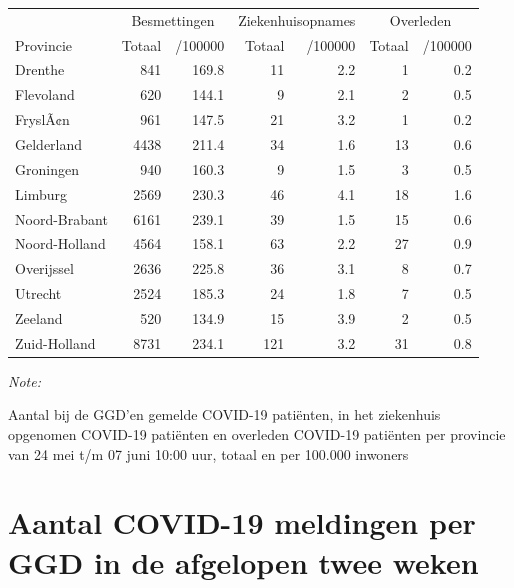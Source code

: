 \documentclass[
  english,
  man,floatsintext]{apa6}
\begin{document}
\begin{table}
\centering
\begin{threeparttable}
\begin{tabular}{lrrrrrr}
\toprule
\multicolumn{1}{c}{ } & \multicolumn{2}{c}{Besmettingen} & \multicolumn{2}{c}{Ziekenhuisopnames} & \multicolumn{2}{c}{Overleden} \\
\cmidrule(l{3pt}r{3pt}){2-3} \cmidrule(l{3pt}r{3pt}){4-5} \cmidrule(l{3pt}r{3pt}){6-7}
Provincie & Totaal & /100000 & Totaal & /100000 & Totaal & /100000\\
\midrule
Drenthe & 841 & 169.8 & 11 & 2.2 & 1 & 0.2\\
Flevoland & 620 & 144.1 & 9 & 2.1 & 2 & 0.5\\
FryslÃ¢n & 961 & 147.5 & 21 & 3.2 & 1 & 0.2\\
Gelderland & 4438 & 211.4 & 34 & 1.6 & 13 & 0.6\\
Groningen & 940 & 160.3 & 9 & 1.5 & 3 & 0.5\\
Limburg & 2569 & 230.3 & 46 & 4.1 & 18 & 1.6\\
Noord-Brabant & 6161 & 239.1 & 39 & 1.5 & 15 & 0.6\\
Noord-Holland & 4564 & 158.1 & 63 & 2.2 & 27 & 0.9\\
Overijssel & 2636 & 225.8 & 36 & 3.1 & 8 & 0.7\\
Utrecht & 2524 & 185.3 & 24 & 1.8 & 7 & 0.5\\
Zeeland & 520 & 134.9 & 15 & 3.9 & 2 & 0.5\\
Zuid-Holland & 8731 & 234.1 & 121 & 3.2 & 31 & 0.8\\
\bottomrule
\end{tabular}
\begin{tablenotes}
\item \textit{Note: } 
\item Aantal bij de GGD’en gemelde COVID-19 patiënten, in het ziekenhuis opgenomen COVID-19 patiënten en overleden COVID-19 patiënten per provincie van 24 mei t/m 07 juni 10:00 uur, totaal en per 100.000 inwoners
\end{tablenotes}
\end{threeparttable}
\end{table}

\newpage

\hypertarget{aantal-covid-19-meldingen-per-ggd-in-de-afgelopen-twee-weken}{%
\section{Aantal COVID-19 meldingen per GGD in de afgelopen twee weken}\label{aantal-covid-19-meldingen-per-ggd-in-de-afgelopen-twee-weken}}
\end{document}
